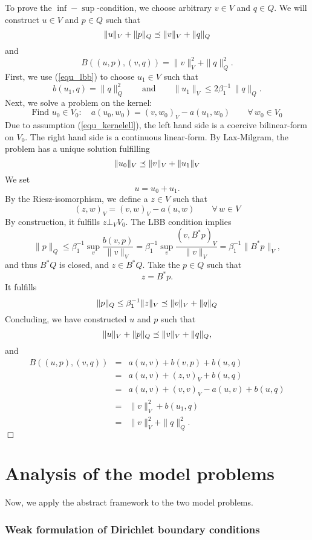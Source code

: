 To prove the $\inf-\sup$-condition, we choose 
arbitrary $v \in V$ and $q \in Q$. We will construct $u \in V$ and 
$p \in Q$ such that
$$
\| u \|_V + \| p \|_Q \preceq \| v \|_V + \| q \|_Q
$$
and
$$
B((u,p),(v,q)) = \| v \|_V^2 + \| q \|_Q^2.
$$
First, we use (\ref{equ_lbb}) to choose $u_1 \in V$ such that
$$
b(u_1,q) = \| q \|_Q^2 \qquad \mbox{and} \qquad \| u_1 \|_V \leq 2 \beta_1^{-1} \, \| q \|_Q.
$$
Next, we solve a problem on the kernel:
$$
\mbox{Find } u_0 \in V_0 : \quad
a(u_0, w_0) = (v,w_0)_V - a(u_1, w_0) \qquad \forall \, w_0 \in V_0
$$
Due to assumption (\ref{equ_kernelell}), the left hand side is a coercive 
bilinear-form on $V_0$. The right hand side is a continuous linear-form.
By Lax-Milgram, the problem has a unique solution fulfilling
$$
\| u_0 \|_V \preceq \| v \|_V + \| u_1 \|_V
$$
We set 
$$
u = u_0 + u_1.
$$
By the Riesz-isomorphism, we define a $z \in V$ such that
$$
(z,w)_V = (v,w)_V - a(u, w) \qquad \forall \, w \in V
$$
By construction, it fulfills $z \bot_V V_0$. The LBB condition implies
$$
\| p \|_Q \leq 
\beta_1^{-1} \sup_v \frac{b(v,p)}{\| v\|_V} 
= \beta_1^{-1} \sup_v \frac{(v, B^\ast p)_V}{\| v\|_V} 
= \beta_1^{-1} \| B^\ast p \|_V,
$$
and thus $B^\ast Q$ is closed, and $z \in B^\ast Q$. Take the $p \in Q$ such that
$$
z = B^\ast p.
$$
It fulfills
$$
\| p \|_Q \leq \beta_1^{-1} \| z \|_V \preceq \| v \|_V + \| q \|_Q
$$
Concluding, we have constructed $u$ and $p$ such that
$$
\| u \|_V + \| p \|_Q \preceq \| v \|_V + \| q \|_Q,
$$
and
\begin{eqnarray*}
B((u,p),(v,q)) & = & a(u,v) + b(v,p) + b(u,q) \\
        & = & a(u,v) + (z,v)_V + b(u,q) \\
        & = & a(u,v) + (v,v)_V - a(u,v) + b(u,q) \\
        & = & \| v \|_V^2 + b(u_1, q) \\
        & = & \| v \|_V^2 + \| q \|_Q^2.
\end{eqnarray*}
\hfill $\Box$

\section{Analysis of the model problems}
Now, we apply the abstract framework to the two model problems.

\subsubsection{Weak formulation of Dirichlet boundary conditions}

